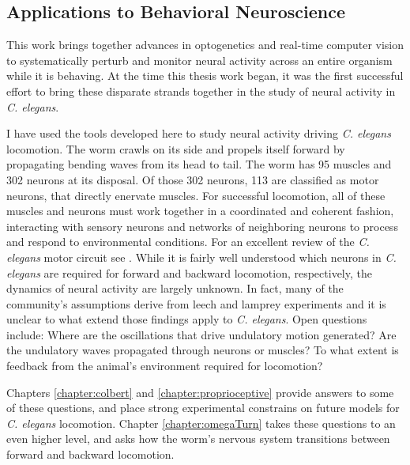 \subsection{Applications to Behavioral Neuroscience}


This work brings together advances in optogenetics and real-time computer vision to systematically perturb and monitor neural activity across an entire organism while it is behaving.  At the time this thesis work began, it was the first successful effort to bring these disparate strands together in the study of neural activity in \textit{C. elegans}.

I have used the tools developed here to study neural activity driving \emph{C. elegans} locomotion. The worm crawls on its side and propels itself forward by propagating bending waves from its head to tail.  The worm has 95 muscles and 302 neurons at its disposal. Of those 302 neurons, 113 are classified as motor neurons, that  directly enervate muscles. For successful locomotion, all of these muscles and neurons must work together in a coordinated and coherent fashion, interacting with sensory neurons and  networks of neighboring neurons to process and respond to environmental conditions. For an excellent review of the \textit{C. elegans}  motor circuit see \citep{von_stetina_motor_2006}. While it is fairly well understood which neurons  in \textit{C. elegans} are required for forward and backward locomotion, respectively, the dynamics of neural activity are largely unknown. In fact, many of the community's assumptions derive from leech and lamprey experiments \citep{friesen_sensory_2001, karbowski_systems_2008} and it is unclear to what extend those findings apply to \textit{C. elegans}. Open questions include: Where are the oscillations that drive undulatory motion generated? Are the undulatory waves propagated through neurons or muscles? To what extent is  feedback from the animal's environment required for locomotion? 

%

%     
%    

Chapters \ref{chapter:colbert} and \ref{chapter:proprioceptive} provide answers to some of these questions, and place strong experimental constrains on future models for \textit{C. elegans} locomotion.  Chapter \ref{chapter:omegaTurn} takes these questions to an even higher level, and asks how the worm's nervous system transitions between forward and backward locomotion. 



